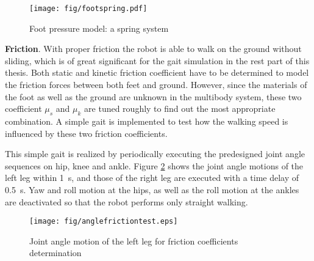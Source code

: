 \begin{figure}[H]
	\centering
	\texttt{[image: fig/footspring.pdf]}
	\caption{Foot pressure model: a spring system}
	\label{footspringdamper}
\end{figure}



\textbf{Friction}. With proper friction the robot is able to walk on the  ground without sliding, which is of great significant for the gait simulation in the rest part of this thesis. Both static and kinetic friction coefficient have to be determined to model the friction forces between both feet and ground. However, since the materials of the foot as well as the ground are unknown in the multibody system, these two coefficient $ \mu_s $ and $ \mu_k $ are tuned roughly to find out the most appropriate combination. A simple gait is implemented to test how the walking speed is influenced by these two friction coefficients.

This simple gait is realized by periodically executing the predesigned joint angle sequences on hip, knee and ankle. Figure {\ref{anlgefrictiontest}} shows the joint angle motions of the left leg within \SI{1}{\second}, and those of the right leg are executed with a time delay of \SI{0.5}{\second}. Yaw and roll motion at the hips, as well as the roll motion at the ankles are deactivated so that the robot performs only straight walking.

\begin{figure}[H]
	\centering
	\texttt{[image: fig/anglefrictiontest.eps]}
	\caption{Joint angle motion of the left leg for friction coefficients determination}
	\label{anlgefrictiontest}
\end{figure}

